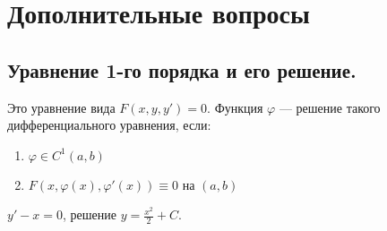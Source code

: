 






\section*{Дополнительные вопросы}

\subsection*{Уравнение 1-го порядка и его решение.}

Это уравнение вида \(F(x, y, y') = 0\).
Функция \(\varphi\) --- решение такого дифференциального уравнения, если:
\begin{enumerate}
    \item \(\varphi\in C^1(a, b)\)
    \item \(F(x, \varphi(x), \varphi'(x)) \equiv 0\) на \((a, b)\)
\end{enumerate}
\begin{example}
    \(y' - x = 0\), решение \(y = \frac{x^2}{2} + C\).
\end{example}

